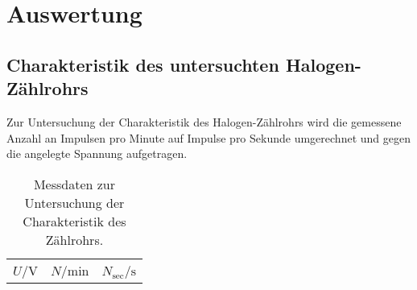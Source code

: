 \section{Auswertung}
\label{sec:Auswertung}
\subsection{Charakteristik des untersuchten Halogen-Zählrohrs}
Zur Untersuchung der Charakteristik des Halogen-Zählrohrs wird die gemessene Anzahl an Impulsen pro Minute auf Impulse pro Sekunde umgerechnet und gegen die angelegte Spannung aufgetragen.


\begin{longtable}{ccc}
  \caption{Messdaten zur Untersuchung der Charakteristik des Zählrohrs.}\label{tab:atab}\\
\toprule
$U$/$\si{\volt}$ &$N$/$\si{\minute}$&$N_\mathrm{sec}$/$\si{\second}$ \\


\end{longtable}
